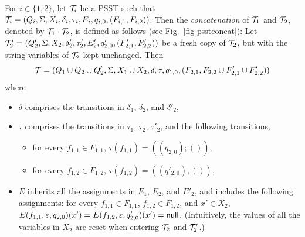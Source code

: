 \begin{definition}\label{def-psstconcat}
For $i \in \{1,2\}$, let $\mathcal{T}_i$ be a PSST such that $\mathcal{T}_i = (Q_i, \Sigma, X_i, \delta_i, \tau_i, E_i, q_{i,0}, (F_{i,1}, F_{i,2}))$. Then the \emph{concatenation} of $\mathcal{T}_1$ and $\mathcal{T}_2$, denoted by $\mathcal{T}_1 \cdot \mathcal{T}_2$, is defined as follows (see Fig.~\ref{fig-psstconcat}): 
Let  
$\mathcal{T}'_{2} = (Q'_{2}, \Sigma, X_{2}, \delta'_{2}, \tau'_{2}, E_{2}', q'_{2,0}, (F'_{2, 1}, F'_{2,2}))$ be a fresh copy of $\mathcal{T}_{2}$, but with the string variables of $\mathcal{T}_{2}$ kept unchanged. 
Then 
%
\[\mathcal{T} = ( Q_{1} \cup Q_{2} \cup Q'_{2}, \Sigma, X_1 \cup X_2, \delta, \tau, q_{1,0}, (F_{2,1}, F_{2,2} \cup F'_{2,1} \cup F'_{2,2}))\] 
where 
	\begin{itemize}
	\item $\delta$ comprises the transitions in $\delta_1$, $\delta_2$, and $\delta'_2$,
%
	\item $\tau$ comprises the transitions in $\tau_1$, $\tau_2$, $\tau'_2$, and the following transitions,
	\begin{itemize}
%
	\item for every $f_{1,1} \in F_{1,1}$, $\tau(f_{1,1}) = ((q_{2,0}); ())$, 
%
	\item for every $f_{1,2} \in F_{1,2}$, $\tau(f_{1,2}) = ((q'_{2,0}), ())$,
	\end{itemize}
	\item $E$ inherits all the assignments in $E_1$, $E_2$, and $E'_2$, and includes the following assignments:  for every $f_{1,1} \in F_{1,1}$, $f_{1,2} \in F_{1,2}$, and $x' \in X_2$, $E(f_{1,1}, \varepsilon, q_{2,0})(x') = E(f_{1,2}, \varepsilon, q'_{2,0})(x')= \mathsf{null}$. (Intuitively, the values of all the variables in $X_2$ are reset when entering $\mathcal{T}_2$ and $\mathcal{T}'_2$.)
  \end{itemize}
		\begin{figure}[tb]

\end{figure}
\end{definition}
